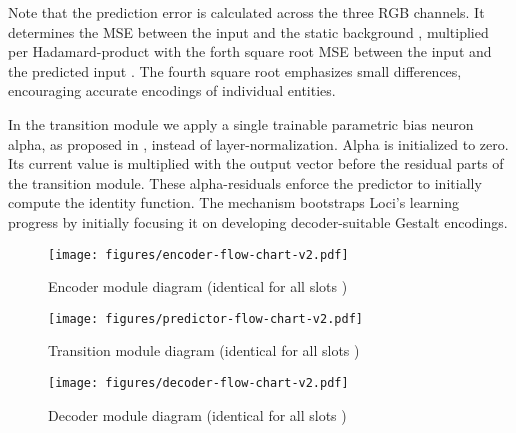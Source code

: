 \documentclass{article} \usepackage{iclr2023_conference_arxiv,times}
\begin{document}
Note that the prediction error is calculated across the three RGB channels. 
It determines the MSE between the input  and the static background , multiplied per Hadamard-product with the forth square root MSE between the input  and the predicted input .
The fourth square root emphasizes small differences, encouraging accurate encodings of individual entities.

In the transition module we apply a single trainable parametric bias neuron alpha, as proposed in \citet{bachlechner2021rezero}, instead of layer-normalization. 
Alpha is initialized to zero.
Its current value is multiplied with the output vector before the residual parts of the transition module. 
These alpha-residuals enforce the predictor to initially compute the identity function.
The mechanism bootstraps Loci's learning progress by initially focusing it on developing decoder-suitable Gestalt encodings.







\begin{figure}[ht!]
  \centering
  \texttt{[image: figures/encoder-flow-chart-v2.pdf]}
  \caption{Encoder module diagram (identical for all slots )}
  \label{fig:encoder_flow_chart}
\end{figure}

\begin{figure}[!b]
  \centering
  \texttt{[image: figures/predictor-flow-chart-v2.pdf]}
  \caption{Transition module diagram (identical for all slots )}
  \label{fig:predictor_flow_chart}
\end{figure}


\begin{figure}[htb!]
  \centering
  \texttt{[image: figures/decoder-flow-chart-v2.pdf]}
  \caption{Decoder module diagram (identical for all slots )}
  \label{fig:decoder_flow_chart}
\end{figure}


 



%
 
\end{document}
